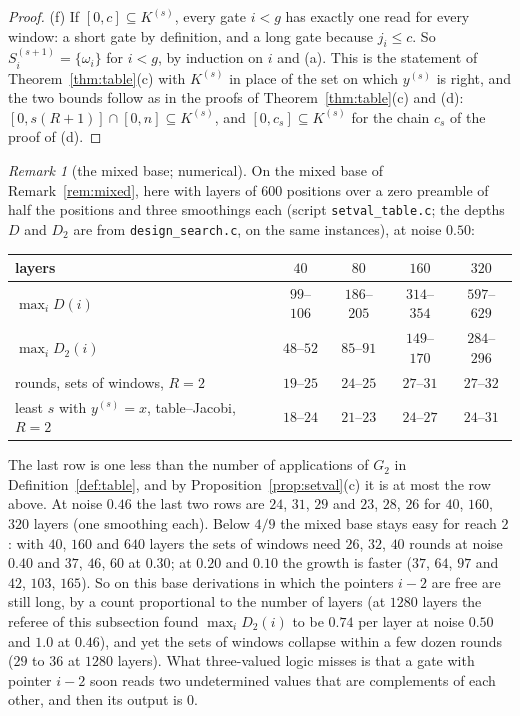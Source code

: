 \documentclass[11pt]{amsart}
\theoremstyle{definition}
\theoremstyle{remark}
\newtheorem{remark}[theorem]{Remark}
\begin{document}
\begin{proof}
(f) If $[0,c]\subseteq K^{(s)}$, every gate $i<g$ has exactly one read for every window: a short
gate by definition, and a long gate because $j_i\le c$. So $S^{(s+1)}_i=\{\omega_i\}$ for $i<g$, by
induction on $i$ and (a). This is the statement of Theorem~\ref{thm:table}(c) with $K^{(s)}$ in
place of the set on which $y^{(s)}$ is right, and the two bounds follow as in the proofs of
Theorem~\ref{thm:table}(c) and (d): $[0,s(R+1)]\cap[0,n]\subseteq K^{(s)}$, and
$[0,c_s]\subseteq K^{(s)}$ for the chain $c_s$ of the proof of (d).
\end{proof}

\begin{remark}[the mixed base; numerical]\label{rem:setval}
On the mixed base of Remark~\ref{rem:mixed}, here with layers of $600$ positions over a zero
preamble of half the positions and three smoothings each (script \texttt{setval\_table.c}; the
depths $D$ and $D_2$ are from \texttt{design\_search.c}, on the same instances), at noise $0.50$:
\begin{center}
\begin{tabular}{lcccc}
\toprule
layers & $40$ & $80$ & $160$ & $320$\\
\midrule
$\max_iD(i)$ & $99$--$106$ & $186$--$205$ & $314$--$354$ & $597$--$629$\\
$\max_iD_2(i)$ & $48$--$52$ & $85$--$91$ & $149$--$170$ & $284$--$296$\\
rounds, sets of windows, $R=2$ & $19$--$25$ & $24$--$25$ & $27$--$31$ & $27$--$32$\\
least $s$ with $y^{(s)}=x$, table--Jacobi, $R=2$ & $18$--$24$ & $21$--$23$ & $24$--$27$ & $24$--$31$\\
\bottomrule
\end{tabular}
\end{center}
The last row is one less than the number of applications of $G_2$ in
Definition~\ref{def:table}, and by Proposition~\ref{prop:setval}(c) it is at most the row above.
At noise $0.46$ the last two rows are $24$, $31$, $29$ and $23$, $28$, $26$ for $40$, $160$,
$320$ layers (one smoothing each). Below $4/9$ the mixed base stays easy for reach $2$: with
$40$, $160$ and $640$ layers the sets of windows need $26$, $32$, $40$ rounds at noise $0.40$ and
$37$, $46$, $60$ at $0.30$; at $0.20$ and $0.10$ the growth is faster ($37$, $64$, $97$ and
$42$, $103$, $165$). So on this base derivations in which the pointers $i-2$ are free are still
long, by a count proportional to the number of layers (at $1280$ layers the referee of this
subsection found $\max_iD_2(i)$ to be $0.74$ per layer at noise $0.50$ and $1.0$ at $0.46$), and
yet the sets of windows collapse within a few dozen rounds ($29$ to $36$ at $1280$ layers). What
three-valued logic misses is that a gate with pointer $i-2$ soon reads two undetermined values
that are complements of each other, and then its output is $0$.


\end{remark}
\end{document}
